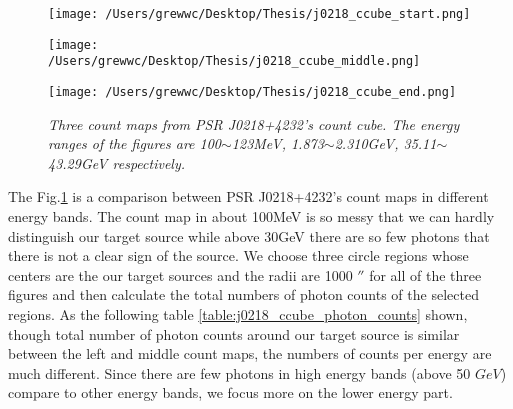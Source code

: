 \documentclass[12pt]{report}
\newcommand{\mycaption}[1]{\caption{\textit{\footnotesize #1}}}
\begin{document}
          \begin{figure}[!ht]
            \begin{minipage}{0.32\textwidth}
              \begin{center} 
                \texttt{[image: /Users/grewwc/Desktop/Thesis/j0218\_ccube\_start.png]}
              \end{center}
            \end{minipage}
            \begin{minipage}{0.32\textwidth}
              \begin{center}
                \texttt{[image: /Users/grewwc/Desktop/Thesis/j0218\_ccube\_middle.png]}
              \end{center}
            \end{minipage}
            \begin{minipage}{0.32\textwidth}
              \begin{center}
              \texttt{[image: /Users/grewwc/Desktop/Thesis/j0218\_ccube\_end.png]}
              \end{center}
            \end{minipage}
            \mycaption{Three count maps from PSR J0218+4232's count cube. The energy ranges of the figures are 
              100$\sim$123MeV, 1.873$\sim$2.310GeV, 35.11$\sim$43.29GeV respectively.}
            \label{fig: j0218_ccube_bin_1_and_15}
          \end{figure}
          
          The Fig.\ref{fig: j0218_ccube_bin_1_and_15} is a comparison between PSR J0218+4232's count maps in different energy 
          bands. The count map in about 100MeV is so messy that we can hardly distinguish our target source 
          while above 30GeV there are so few photons that there is not a clear sign of the source. 
          We choose three circle regions whose centers are the our target sources and the radii are 1000 $''$ for 
          all of the three figures and then calculate the total numbers of photon counts of the selected regions. 
          As the following table \ref{table:j0218_ccube_photon_counts}
          shown, though total number of photon counts around our target source is similar between the left and middle
          count maps, the 
          numbers of counts per energy are much different. Since there are few photons in high energy bands 
          (above 50 $GeV$) compare to other energy bands, we focus more on the lower energy part. 
\end{document}

